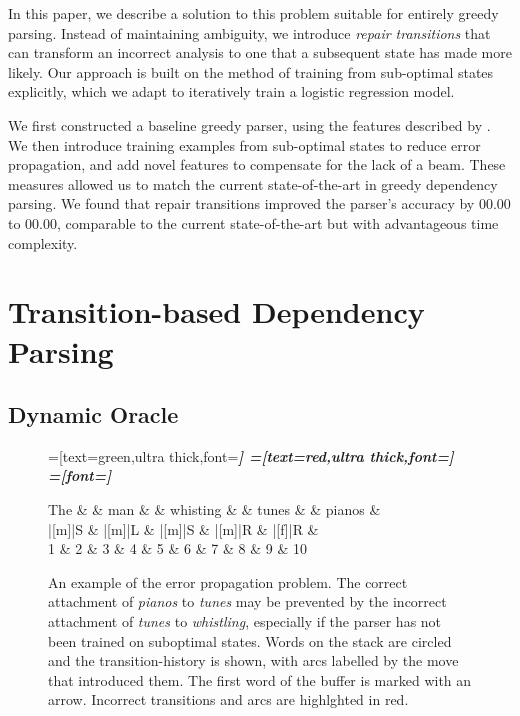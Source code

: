 \documentclass[11pt,letterpaper]{article}
\newcommand{\sysacc}{00.00\xspace}
\newcommand{\sysimprove}{00.00\xspace}
\begin{document}
In this paper, we describe a solution to this problem suitable for entirely greedy
parsing. Instead
of maintaining ambiguity, we introduce \emph{repair transitions} that can
transform an incorrect analysis to one that a subsequent state has made
more likely. Our approach is built on the \citet{goldberg:12} method of training
from sub-optimal states explicitly, which we adapt to iteratively train a 
logistic regression model.

We first constructed a baseline greedy parser, using the features described by
\citet{zhang:11}. We then introduce training examples
from sub-optimal states to reduce error propagation, and add novel
features to compensate for the lack of a beam. These measures allowed us to match the
current state-of-the-art in greedy dependency parsing. We found that
repair transitions improved the parser's accuracy by \sysimprove to \sysacc, 
comparable to the current state-of-the-art but with advantageous time complexity.

\section{Transition-based Dependency Parsing}

\subsection{Dynamic Oracle}

\begin{figure}
\begin{dependency}[theme=simple]

=[text=green,ultra thick,font=\bfseries\itshape]
=[text=red,ultra thick,font=\bfseries\itshape]
=[font=\bfseries\itshape]

\begin{deptext}[column sep=.1cm, row sep=.1ex]
 The \&   \& man    \&      \& whisting \&    \& tunes \&    \& pianos \& \\
|[m]|S \& |[m]|L \& |[m]|S \& |[m]|R \& |[f]|R \& \\
    1   \& 2 \& 3      \& 4    \& 5         \& 6 \&   7    \& 8 \&    9    \& 10 \\
\end{deptext}

\end{dependency}
\caption{
An example of the error propagation problem.
The correct attachment of \emph{pianos} to \emph{tunes} may be
prevented by the incorrect attachment of \emph{tunes} to \emph{whistling},
especially if the parser has not been trained on suboptimal states.
Words on the stack are circled and the transition-history is shown, with arcs
labelled by the move that introduced them. The first word of the buffer is marked
with an arrow. Incorrect transitions and arcs are highlghted in red.
\label{fig:whistling_tunes}}
\end{figure}
\end{document}
